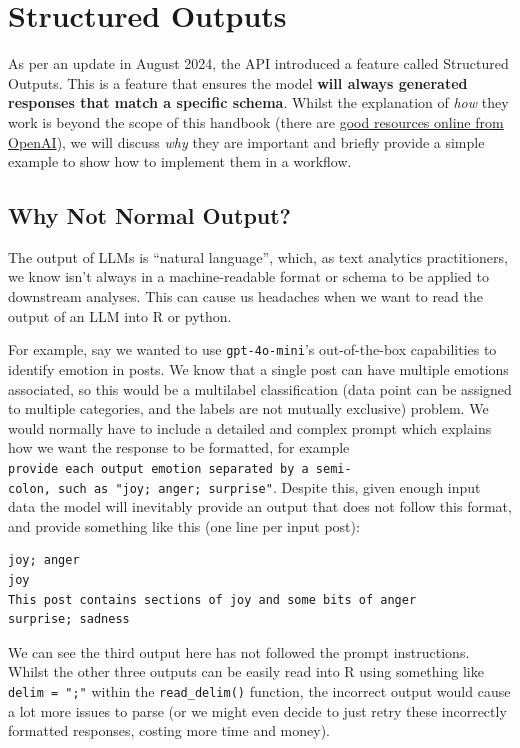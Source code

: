 \documentclass[
  letterpaper,
  DIV=11,
  numbers=noendperiod]{scrreprt}
\begin{document}
\section{Structured Outputs}\label{structured-outputs}

As per an update in August 2024, the API introduced a feature called
Structured Outputs. This is a feature that ensures the model
\textbf{will always generated responses that match a specific schema}.
Whilst the explanation of \emph{how} they work is beyond the scope of
this handbook (there are
\href{https://openai.com/index/introducing-structured-outputs-in-the-api/}{good
resources online from OpenAI}), we will discuss \emph{why} they are
important and briefly provide a simple example to show how to implement
them in a workflow.

\subsection{Why Not Normal Output?}\label{why-not-normal-output}

The output of LLMs is ``natural language'', which, as text analytics
practitioners, we know isn't always in a machine-readable format or
schema to be applied to downstream analyses. This can cause us headaches
when we want to read the output of an LLM into R or python.

For example, say we wanted to use \texttt{gpt-4o-mini}'s out-of-the-box
capabilities to identify emotion in posts. We know that a single post
can have multiple emotions associated, so this would be a multilabel
classification (data point can be assigned to multiple categories, and
the labels are not mutually exclusive) problem. We would normally have
to include a detailed and complex prompt which explains how we want the
response to be formatted, for example
\texttt{provide\ each\ output\ emotion\ separated\ by\ a\ semi-colon,\ such\ as\ "joy;\ anger;\ surprise"}.
Despite this, given enough input data the model will inevitably provide
an output that does not follow this format, and provide something like
this (one line per input post):

\begin{verbatim}
joy; anger
joy
This post contains sections of joy and some bits of anger
surprise; sadness
\end{verbatim}

We can see the third output here has not followed the prompt
instructions. Whilst the other three outputs can be easily read into R
using something like \texttt{delim\ =\ ";"} within the
\texttt{read\_delim()} function, the incorrect output would cause a lot
more issues to parse (or we might even decide to just retry these
incorrectly formatted responses, costing more time and money).
\end{document}
